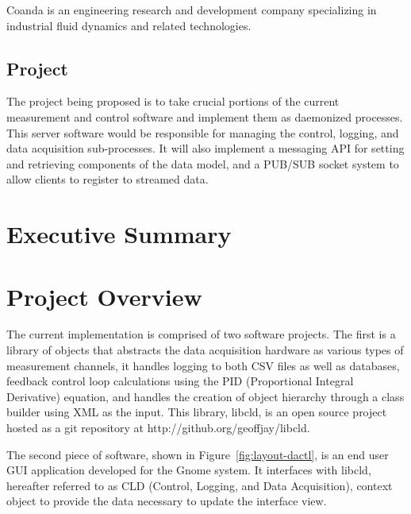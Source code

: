 \documentclass[11pt]{article}
\begin{document}
      Coanda is an engineering research and development company specializing in
      industrial fluid dynamics and related technologies.

    \subsection{Project}\label{sec:bg-project}

      The project being proposed is to take crucial portions of the current
      measurement and control software and implement them as daemonized processes.
      This server software would be responsible for managing the control,
      logging, and data acquisition sub-processes. It will also implement a
      messaging API for setting and retrieving components of the data model,
      and a PUB/SUB socket system to allow clients to register to streamed data.

  \section{Executive Summary}\label{sec:exec}


  \section{Project Overview}\label{sec:desc}

    The current implementation is comprised of two software projects. The first is a
    library of objects that abstracts the data acquisition hardware as various
    types of measurement channels, it handles logging to both CSV files as well
    as databases, feedback control loop calculations using the PID (Proportional
    Integral Derivative) equation, and handles the creation of object hierarchy
    through a class builder using XML as the input. This library, libcld, is an
    open source project hosted as a git repository at http://github.org/geoffjay/libcld.

    The second piece of software, shown in Figure~\ref{fig:layout-dactl}, is an
    end user GUI application developed for the Gnome system. It interfaces with
    libcld, hereafter referred to as CLD (Control, Logging, and Data
    Acquisition), context object to provide the data necessary to update the
    interface view.
\end{document}
